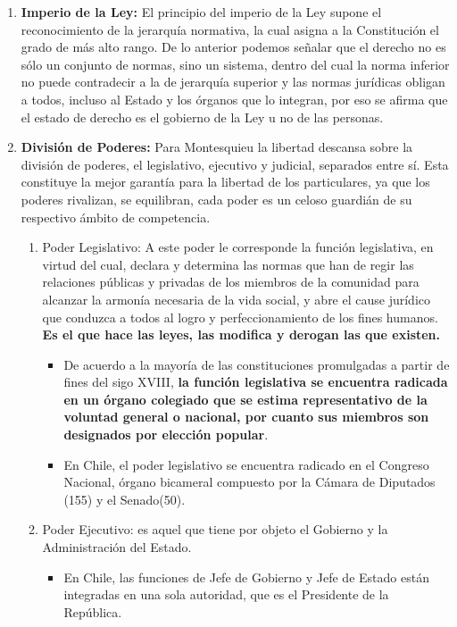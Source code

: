 \documentclass{templateApunte}
\begin{document}
\begin{enumerate}
  \item \textbf{Imperio de la Ley:} El principio del imperio de la Ley supone el reconocimiento de la jerarquía normativa, la cual asigna a la Constitución el grado de m\'as alto rango. De lo anterior podemos se\~nalar que el derecho no es s\'olo un conjunto de normas, sino un sistema, dentro del cual la norma inferior no puede contradecir a la de jerarquía superior y las normas jurídicas obligan a todos, incluso al Estado y los órganos que lo integran, por eso se afirma que el estado de derecho es el gobierno de la Ley u no de las personas.
  
  \item \textbf{División de Poderes:} Para Montesquieu la libertad descansa sobre la divisi\'on de poderes, el legislativo, ejecutivo y judicial, separados entre s\'i. Esta constituye la mejor garantía para la libertad de los particulares, ya que los poderes rivalizan, se equilibran, cada poder es un celoso guardián de su respectivo ámbito de competencia.
  \begin{enumerate}
    \item Poder Legislativo: A este poder le corresponde la función legislativa, en virtud del cual, declara y determina las normas que han de regir las relaciones p\'ublicas y privadas de los miembros de la comunidad para alcanzar la armonía necesaria de la vida social, y abre el cause jurídico que conduzca a todos al logro y perfeccionamiento de los fines humanos. \textbf{Es el que hace las leyes, las modifica y derogan las que existen.}
    \begin{itemize}
      \item De acuerdo a la mayoría de las constituciones promulgadas a partir de fines del sigo XVIII, \textbf{la función legislativa se encuentra radicada en un órgano colegiado que se estima representativo de la voluntad general o nacional, por cuanto sus miembros son designados por elección popular}.
      \item En Chile, el poder legislativo se encuentra radicado en el Congreso Nacional, órgano bicameral compuesto por la Cámara de Diputados (155) y el Senado(50).
    \end{itemize}
    
    \item Poder Ejecutivo: es aquel que tiene por objeto el Gobierno y la Administración del Estado.
    \begin{itemize}
      \item En Chile, las funciones de Jefe de Gobierno y Jefe de Estado est\'an integradas en una sola autoridad, que es el Presidente de la República.
    \end{itemize}
    

\end{enumerate}
\end{enumerate}
\end{document}
